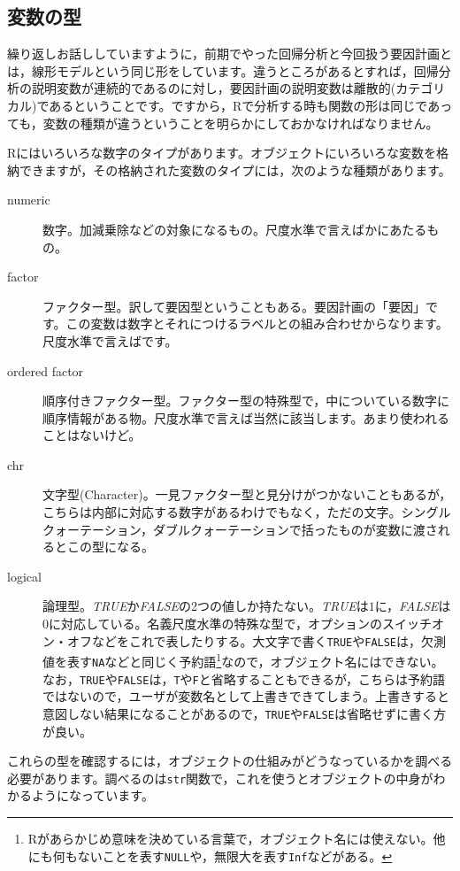 \documentclass{ltjbook}
\begin{document}
\subsection{変数の型}
繰り返しお話ししていますように，前期でやった回帰分析と今回扱う要因計画とは，線形モデルという同じ形をしています。違うところがあるとすれば，回帰分析の説明変数が連続的であるのに対し，要因計画の説明変数は離散的(カテゴリカル)であるということです。ですから，Rで分析する時も関数の形は同じであっても，変数の種類が違うということを明らかにしておかなければなりません。

Rにはいろいろな数字のタイプがあります。オブジェクトにいろいろな変数を格納できますが，その格納された変数のタイプには，次のような種類があります。
\begin{description}
	\item[numeric] 数字。加減乗除などの対象になるもの。尺度水準で言えばかにあたるもの。
	\item[factor] ファクター型。訳して要因型ということもある。要因計画の「要因」です。この変数は数字とそれにつけるラベルとの組み合わせからなります。尺度水準で言えばです。
	\item[ordered factor] 順序付きファクター型。ファクター型の特殊型で，中についている数字に順序情報がある物。尺度水準で言えば当然に該当します。あまり使われることはないけど。
	\item[chr] 文字型(Character)。一見ファクター型と見分けがつかないこともあるが，こちらは内部に対応する数字があるわけでもなく，ただの文字。シングルクォーテーション，ダブルクォーテーションで括ったものが変数に渡されるとこの型になる。
	\item[logical] 論理型。\textit{TRUE}か\textit{FALSE}の2つの値しか持たない。\textit{TRUE}は$1$に，\textit{FALSE}は$0$に対応している。名義尺度水準の特殊な型で，オプションのスイッチオン・オフなどをこれで表したりする。大文字で書く\texttt{TRUE}や\texttt{FALSE}は，欠測値を表す\texttt{NA}などと同じく予約語\footnote{Rがあらかじめ意味を決めている言葉で，オブジェクト名には使えない。他にも何もないことを表す\texttt{NULL}や，無限大を表す\texttt{Inf}などがある。}なので，オブジェクト名にはできない。なお，\texttt{TRUE}や\texttt{FALSE}は，\texttt{T}や\texttt{F}と省略することもできるが，こちらは予約語ではないので，ユーザが変数名として上書きできてしまう。上書きすると意図しない結果になることがあるので，\texttt{TRUE}や\texttt{FALSE}は省略せずに書く方が良い。
\end{description}
これらの型を確認するには，オブジェクトの仕組みがどうなっているかを調べる必要があります。調べるのは\texttt{str}関数で，これを使うとオブジェクトの中身がわかるようになっています。
\end{document}
